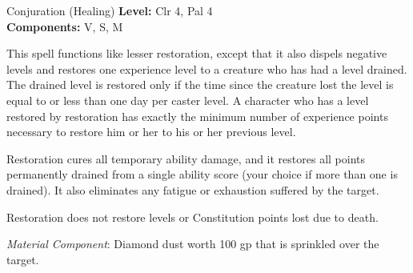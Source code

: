 {Conjuration (Healing)}
{
	\textbf{Level:}
	Clr 4, Pal 4\\
	\textbf{Components:}
	V, S, M\\
}
{
	This spell functions like lesser restoration, except that it also dispels negative levels and restores one experience level to a creature who has had a level drained. The drained level is restored only if the time since the creature lost the level is equal to or less than one day per caster level. A character who has a level restored by restoration has exactly the minimum number of experience points necessary to restore him or her to his or her previous level.

	Restoration cures all temporary ability damage, and it restores all points permanently drained from a single ability score (your choice if more than one is drained). It also eliminates any fatigue or exhaustion suffered by the target.

	Restoration does not restore levels or Constitution points lost due to death.

	\textit{Material Component}:
	Diamond dust worth 100 gp that is sprinkled over the target.

}
